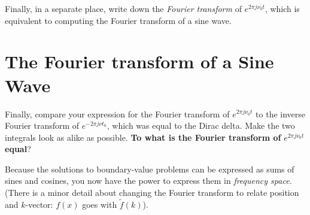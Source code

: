 \documentclass[10pt]{article}
\begin{document}
Finally, in a separate place, write down the \textit{Fourier transform} of $e^{2\pi j \nu_0 t}$, which is equivalent to computing the Fourier transform of a sine wave.

\section{The Fourier transform of a Sine Wave}

Finally, compare your expression for the Fourier transform of $e^{2\pi j \nu_0 t}$ to the inverse Fourier transform of $e^{-2\pi j \nu t_0}$, which was equal to the Dirac delta.  Make the two integrals look as alike as possible.  \textbf{To what is the Fourier transform of} $e^{2\pi j \nu_0 t}$ \textbf{equal}? \\ \vspace{1cm}

Because the solutions to boundary-value problems can be expressed as sums of sines and cosines, you now have the power to express them in \textit{frequency space.}  (There is a minor detail about changing the Fourier transform to relate position and $k$-vector: $f(x)$ goes with $\widetilde{f}(k)$).
\end{document}

